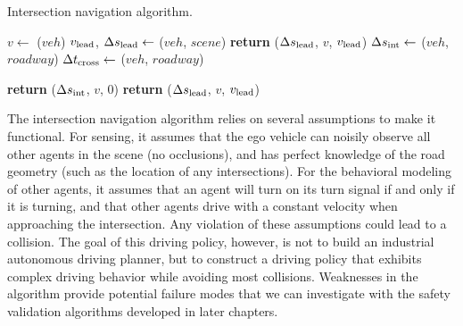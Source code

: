  \begin{algorithm}
\caption{Intersection navigation algorithm.}
    \label{alg:intersection_navigation}
\begin{algorithmic}[1]
        \State $v \gets$ ($veh$)
        \State $v_{\rm lead}$, $\Delta s_{\rm lead} \gets$ ($veh$, $scene$) \label{line:intersectionidm_leading_vehicle}
         \label{line:intersection_if_ROW}
            \State \textbf{return} ($\Delta s_{\rm lead}$, $v$, $v_{\rm lead}$) \label{line:intersection_regular_idm_acc}
        \Else
            \State $\Delta s_{\rm int} \gets$ ($veh$, $roadway$) \label{line:intersection_distance2intersection}
            \State $\Delta t_{\rm cross} \gets$ ($veh$, $roadway$)  \label{line:intersection_timetocross}
            
             \label{line:intersection_occupied}
                \State \textbf{return} ($\Delta s_{\rm int}$, $v$, \num{0}) \label{line:intersection_idm2int}
            \Else
                \State \textbf{return} ($\Delta s_{\rm lead}$, $v$, $v_{\rm lead}$) \label{line:intersection_regular_idm_acc2}
            \EndIf
        \EndIf
    \EndFunction
\end{algorithmic}
\end{algorithm}

The intersection navigation algorithm relies on several assumptions to make it functional. For sensing, it assumes that the ego vehicle can noisily observe all other agents in the scene (no occlusions), and has perfect knowledge of the road geometry (such as the location of any intersections). For the behavioral modeling of other agents, it assumes that an agent will turn on its turn signal if and only if it is turning, and that other agents drive with a constant velocity when approaching the intersection. Any violation of these assumptions could lead to a collision. The goal of this driving policy, however, is not to build an industrial autonomous driving planner, but to construct a driving policy that exhibits complex driving behavior while avoiding most collisions. Weaknesses in the algorithm provide potential failure modes that we can investigate with the safety validation algorithms developed in later chapters. 

